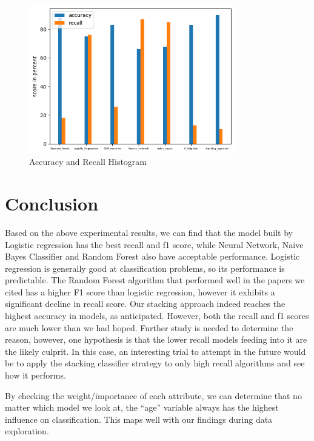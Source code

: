 \documentclass[11pt]{article}
\begin{document}
\begin{figure}[ht]
\centering
\includegraphics[width=0.8\textwidth]{Models.png}
\caption{Accuracy and Recall Histogram}{}
\end{figure}

\section*{Conclusion}

Based on the above experimental results, we can find that the model built by Logistic regression has the best recall and f1 score, while Neural Network, Naive Bayes Classifier and Random Forest also have acceptable performance. Logistic regression is generally good at classification problems, so its performance is predictable. The Random Forest algorithm that performed well in the papers we cited has a higher F1 score than logistic regression, however it exhibits a significant decline in recall score. Our stacking approach indeed reaches the highest accuracy in models, as anticipated. However, both the recall and f1 scores are much lower than we had hoped. Further study is needed to determine the reason, however, one hypothesis is that the lower recall models feeding into it are the likely culprit. In this case, an interesting trial to attempt in the future would be to apply the stacking classifier strategy to only high recall algorithms and see how it performs.

\medskip

By checking the weight/importance of each attribute, we can determine that no matter which model we look at, the “age” variable always has the highest influence on classification. This maps well with our findings during data exploration.

\medskip
\end{document}
